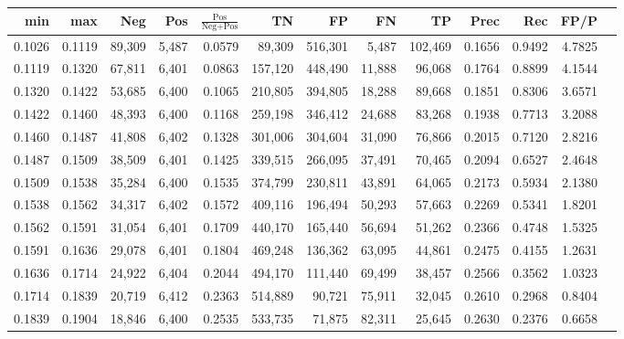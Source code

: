 \begin{tabular}{rrrrrrrrrrrrr}
\toprule
   min &    max &    Neg &   Pos & $\frac{\text{Pos}}{\text{Neg}+\text{Pos}}$ &      TN &      FP &      FN &      TP &   Prec &    Rec &   FP/P \\
\midrule
0.1026 & 0.1119 & 89,309 & 5,487 &                                     0.0579 &  89,309 & 516,301 &   5,487 & 102,469 & 0.1656 & 0.9492 & 4.7825 \\
0.1119 & 0.1320 & 67,811 & 6,401 &                                     0.0863 & 157,120 & 448,490 &  11,888 &  96,068 & 0.1764 & 0.8899 & 4.1544 \\
0.1320 & 0.1422 & 53,685 & 6,400 &                                     0.1065 & 210,805 & 394,805 &  18,288 &  89,668 & 0.1851 & 0.8306 & 3.6571 \\
0.1422 & 0.1460 & 48,393 & 6,400 &                                     0.1168 & 259,198 & 346,412 &  24,688 &  83,268 & 0.1938 & 0.7713 & 3.2088 \\
0.1460 & 0.1487 & 41,808 & 6,402 &                                     0.1328 & 301,006 & 304,604 &  31,090 &  76,866 & 0.2015 & 0.7120 & 2.8216 \\
0.1487 & 0.1509 & 38,509 & 6,401 &                                     0.1425 & 339,515 & 266,095 &  37,491 &  70,465 & 0.2094 & 0.6527 & 2.4648 \\
0.1509 & 0.1538 & 35,284 & 6,400 &                                     0.1535 & 374,799 & 230,811 &  43,891 &  64,065 & 0.2173 & 0.5934 & 2.1380 \\
0.1538 & 0.1562 & 34,317 & 6,402 &                                     0.1572 & 409,116 & 196,494 &  50,293 &  57,663 & 0.2269 & 0.5341 & 1.8201 \\
0.1562 & 0.1591 & 31,054 & 6,401 &                                     0.1709 & 440,170 & 165,440 &  56,694 &  51,262 & 0.2366 & 0.4748 & 1.5325 \\
0.1591 & 0.1636 & 29,078 & 6,401 &                                     0.1804 & 469,248 & 136,362 &  63,095 &  44,861 & 0.2475 & 0.4155 & 1.2631 \\
0.1636 & 0.1714 & 24,922 & 6,404 &                                     0.2044 & 494,170 & 111,440 &  69,499 &  38,457 & 0.2566 & 0.3562 & 1.0323 \\
0.1714 & 0.1839 & 20,719 & 6,412 &                                     0.2363 & 514,889 &  90,721 &  75,911 &  32,045 & 0.2610 & 0.2968 & 0.8404 \\
0.1839 & 0.1904 & 18,846 & 6,400 &                                     0.2535 & 533,735 &  71,875 &  82,311 &  25,645 & 0.2630 & 0.2376 & 0.6658 \\

\end{tabular}
